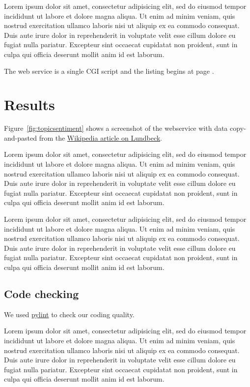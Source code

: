 \documentclass[10pt]{IEEEtran}
\begin{document}
Lorem ipsum dolor sit amet, consectetur adipisicing elit, sed do
eiusmod tempor incididunt ut labore et dolore magna aliqua. Ut enim ad
minim veniam, quis nostrud exercitation ullamco laboris nisi ut
aliquip ex ea commodo consequat. Duis aute irure dolor in
reprehenderit in voluptate velit esse cillum dolore eu fugiat nulla
pariatur. Excepteur sint occaecat cupidatat non proident, sunt in
culpa qui officia deserunt mollit anim id est laborum.

The web service is a single CGI script and the listing begins at page
\pageref{listing:brede_str_nmf}. 

\section{Results}


Figure~\ref{fig:topicsentiment} shows a screenshot of the webservice
with data copy-and-pasted from the
\href{http://en.wikipedia.org/wiki/Lundbeck}{Wikipedia article on
  Lundbeck}. 

Lorem ipsum dolor sit amet, consectetur adipisicing elit, sed do
eiusmod tempor incididunt ut labore et dolore magna aliqua. Ut enim ad
minim veniam, quis nostrud exercitation ullamco laboris nisi ut
aliquip ex ea commodo consequat. Duis aute irure dolor in
reprehenderit in voluptate velit esse cillum dolore eu fugiat nulla
pariatur. Excepteur sint occaecat cupidatat non proident, sunt in
culpa qui officia deserunt mollit anim id est laborum.

Lorem ipsum dolor sit amet, consectetur adipisicing elit, sed do
eiusmod tempor incididunt ut labore et dolore magna aliqua. Ut enim ad
minim veniam, quis nostrud exercitation ullamco laboris nisi ut
aliquip ex ea commodo consequat. Duis aute irure dolor in
reprehenderit in voluptate velit esse cillum dolore eu fugiat nulla
pariatur. Excepteur sint occaecat cupidatat non proident, sunt in
culpa qui officia deserunt mollit anim id est laborum.

\subsection{Code checking}

We used \href{http://www.logilab.org/857}{pylint} to check our coding
quality. 

Lorem ipsum dolor sit amet, consectetur adipisicing elit, sed do
eiusmod tempor incididunt ut labore et dolore magna aliqua. Ut enim ad
minim veniam, quis nostrud exercitation ullamco laboris nisi ut
aliquip ex ea commodo consequat. Duis aute irure dolor in
reprehenderit in voluptate velit esse cillum dolore eu fugiat nulla
pariatur. Excepteur sint occaecat cupidatat non proident, sunt in
culpa qui officia deserunt mollit anim id est laborum.
\end{document}
